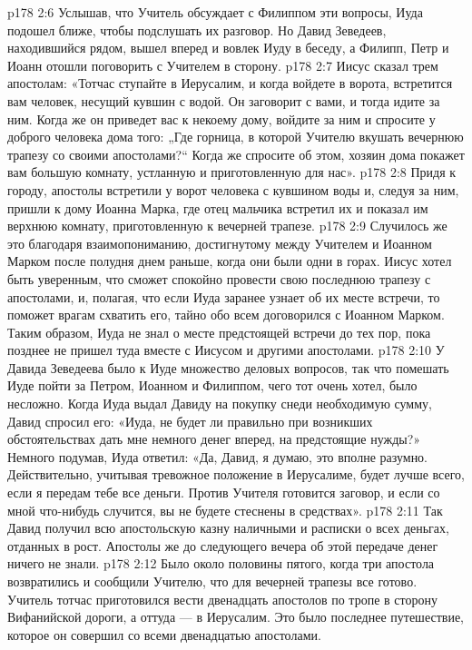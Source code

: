 \vs p178 2:6 Услышав, что Учитель обсуждает с Филиппом эти вопросы, Иуда подошел ближе, чтобы подслушать их разговор. Но Давид Зеведеев, находившийся рядом, вышел вперед и вовлек Иуду в беседу, а Филипп, Петр и Иоанн отошли поговорить с Учителем в сторону.
\vs p178 2:7 Иисус сказал трем апостолам: «Тотчас ступайте в Иерусалим, и когда войдете в ворота, встретится вам человек, несущий кувшин с водой. Он заговорит с вами, и тогда идите за ним. Когда же он приведет вас к некоему дому, войдите за ним и спросите у доброго человека дома того: „Где горница, в которой Учителю вкушать вечернюю трапезу со своими апостолами?“ Когда же спросите об этом, хозяин дома покажет вам большую комнату, устланную и приготовленную для нас».
\vs p178 2:8 Придя к городу, апостолы встретили у ворот человека с кувшином воды и, следуя за ним, пришли к дому Иоанна Марка, где отец мальчика встретил их и показал им верхнюю комнату, приготовленную к вечерней трапезе.
\vs p178 2:9 Случилось же это благодаря взаимопониманию, достигнутому между Учителем и Иоанном Марком после полудня днем раньше, когда они были одни в горах. Иисус хотел быть уверенным, что сможет спокойно провести свою последнюю трапезу с апостолами, и, полагая, что если Иуда заранее узнает об их месте встречи, то поможет врагам схватить его, тайно обо всем договорился с Иоанном Марком. Таким образом, Иуда не знал о месте предстоящей встречи до тех пор, пока позднее не пришел туда вместе с Иисусом и другими апостолами.
\vs p178 2:10 \pc У Давида Зеведеева было к Иуде множество деловых вопросов, так что помешать Иуде пойти за Петром, Иоанном и Филиппом, чего тот очень хотел, было несложно. Когда Иуда выдал Давиду на покупку снеди необходимую сумму, Давид спросил его: «Иуда, не будет ли правильно при возникших обстоятельствах дать мне немного денег вперед, на предстоящие нужды?» Немного подумав, Иуда ответил: «Да, Давид, я думаю, это вполне разумно. Действительно, учитывая тревожное положение в Иерусалиме, будет лучше всего, если я передам тебе все деньги. Против Учителя готовится заговор, и если со мной что\hyp{}нибудь случится, вы не будете стеснены в средствах».
\vs p178 2:11 Так Давид получил всю апостольскую казну наличными и расписки о всех деньгах, отданных в рост. Апостолы же до следующего вечера об этой передаче денег ничего не знали.
\vs p178 2:12 \pc Было около половины пятого, когда три апостола возвратились и сообщили Учителю, что для вечерней трапезы все готово. Учитель тотчас приготовился вести двенадцать апостолов по тропе в сторону Вифанийской дороги, а оттуда --- в Иерусалим. Это было последнее путешествие, которое он совершил со всеми двенадцатью апостолами.
